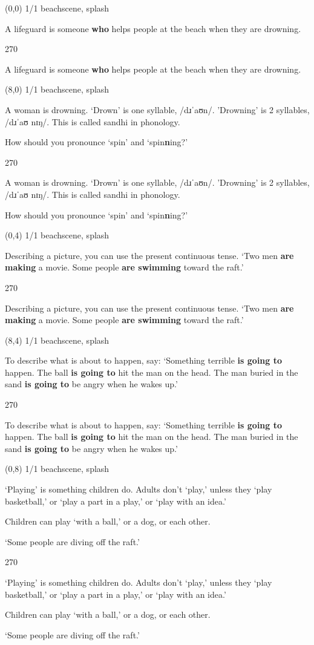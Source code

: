\documentclass[a4paper]{article}
\newenvironment{itemize*}%
{\begin{itemize}%
 \setlength{\itemsep}{0.0cm}%
 \setlength{\parsep}{0pt}%
 \setlength{\parskip}{0pt}}%
{\end{itemize}}
\newcommand{\mycard}[3]{%
	\small #1 #2
	\par
	\parbox[t][6.8cm][c]{9.5cm}{%
	\par
	\myleft{#3}
	\par
	\myright{#3}
	}
}
\newcommand{\myleft}[1]{%
	\begin{sideways}
	\hspace*{-0.9cm}
		\parbox[t][2.7cm][t]{6.5cm}{%
		\large #1
		}
	\end{sideways}
}
\newcommand{\myright}[1]{%
	\hspace*{6.5cm}
	\begin{turn}{270}
	\hspace*{-7.1cm}
		\parbox[t][2.7cm][t]{6.5cm}{%
		\large #1
		}
	\end{turn}
}
\begin{document}
\begin{textblock}{8}(0,0)
\mycard{1/1}{beachscene, splash}{
\begin{itemize*}
\item A lifeguard is someone \textbf{who} helps people at the beach when they are drowning.
\end{itemize*}
}
\end{textblock}

\begin{textblock}{8}(8,0)
\mycard{1/1}{beachscene, splash}{
\begin{itemize*}
\item A woman is drowning. `Drown' is one syllable, {\IPAfont /dɹˈaʊn/}. 'Drowning' is 2 syllables, {\IPAfont /dɹˈaʊ nɪŋ/}. This is called sandhi in phonology.
\item How should you pronounce `spin' and `spin\textbf{n}ing?'
\end{itemize*}
}
\end{textblock}

\begin{textblock}{8}(0,4)
\mycard{1/1}{beachscene, splash}{
\begin{itemize*}
\item Describing a picture, you can use the present continuous tense. `Two men \textbf{are making} a movie. Some people \textbf{are swimming} toward the raft.'
\end{itemize*}
}
\end{textblock}

\begin{textblock}{8}(8,4)
\mycard{1/1}{beachscene, splash}{
\begin{itemize*}
\item To describe what is about to happen, say: `Something terrible \textbf{is going to} happen. The ball \textbf{is going to} hit the man on the head. The man buried in the sand \textbf{is going to} be angry when he wakes up.'
\end{itemize*}
}
\end{textblock}

\begin{textblock}{8}(0,8)
\mycard{1/1}{beachscene, splash}{
\begin{itemize*}
\item `Playing' is something children do. Adults don't `play,' unless they `play basketball,' or `play a part in a play,' or `play with an idea.'
\item Children can play `with a ball,' or a dog, or each other. 
\item `Some people are diving off the raft.'
\end{itemize*}
}
\end{textblock}
\end{document}

